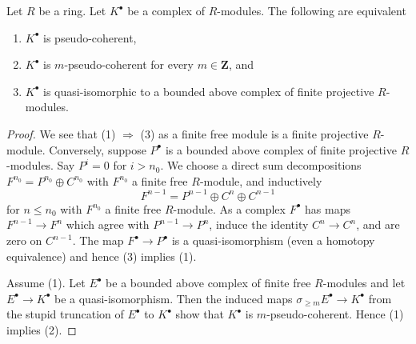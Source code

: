 \begin{lemma}
\label{lemma-pseudo-coherent}
Let $R$ be a ring. Let $K^\bullet$ be a complex of $R$-modules.
The following are equivalent
\begin{enumerate}
\item $K^\bullet$ is pseudo-coherent,
\item $K^\bullet$ is $m$-pseudo-coherent for every $m \in \mathbf{Z}$, and
\item $K^\bullet$ is quasi-isomorphic to a bounded above complex of finite
projective $R$-modules.
\end{enumerate}
\end{lemma}

\begin{proof}
We see that (1) $\Rightarrow$ (3) as a finite free module is a finite
projective $R$-module. Conversely, suppose $P^\bullet$ is a bounded
above complex of finite projective $R$-modules. Say $P^i = 0$ for
$i > n_0$. We choose a direct sum decompositions
$F^{n_0} = P^{n_0} \oplus C^{n_0}$ with $F^{n_0}$ a finite free
$R$-module, and inductively
$$
F^{n - 1} = P^{n - 1} \oplus C^n \oplus C^{n - 1}
$$
for $n \leq n_0$ with $F^{n_0}$ a finite free $R$-module. As a complex
$F^\bullet$ has maps $F^{n - 1} \to F^n$ which agree with $P^{n - 1} \to P^n$,
induce the identity $C^n \to C^n$, and are zero on $C^{n - 1}$. The map
$F^\bullet \to P^\bullet$ is a quasi-isomorphism (even a homotopy equivalence)
and hence (3) implies (1).

\medskip\noindent
Assume (1). Let $E^\bullet$ be a bounded above complex of finite free
$R$-modules and let $E^\bullet \to K^\bullet$ be a
quasi-isomorphism. Then the induced maps
$\sigma_{\geq m}E^\bullet \to K^\bullet$ from the stupid truncation
of $E^\bullet$ to $K^\bullet$ show that $K^\bullet$ is $m$-pseudo-coherent.
Hence (1) implies (2).


\end{proof}
